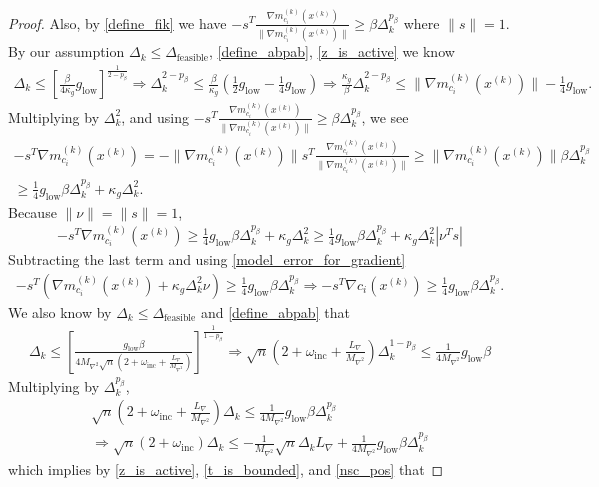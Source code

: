 \documentclass{article}
\theoremstyle{case}
\numberwithin{theorem}{subsection}
\newcommand{\dfeas}{{\Delta_{\textrm{feasible}}}}
\newcommand{\dk}{\Delta_k}
\newcommand{\gmcik}{{\nabla m_{c_i}^{(k)}\left(\xk\right)}}
\newcommand{\hgik}{{\frac{\nabla m^{(k)}_{c_i}(\xk)}{\|\nabla m^{(k)}_{c_i}\left(\xk\right)\|}}}
\newcommand{\lipgrad}{{L_{\nabla}}}
\newcommand{\maxhessian}{{M_{\nabla^2}}}
\newcommand{\mingrad}{{ g_{\textrm{low}} }}
\newcommand{\omegainc}{\omega_{\text{inc}}}
\newcommand{\xk}{x^{(k)}}
\begin{document}
\begin{proof}
Also, by \cref{define_fik} we have $-s^T \hgik \ge \beta \dk^{p_{\beta}}$ where $\|s\| = 1$.
By our assumption $\dk \le \dfeas$, \cref{define_abpab}, \cref{z_is_active} we know
\begin{align*}
\dk \le \left[\frac{\beta}{4\kappa_g}\mingrad \right]^{\frac 1 {2 - p_{\beta}}}
\Longrightarrow \dk^{2 - p_{\beta}} \le \frac{\beta}{\kappa_g}\left(\frac 1 2\mingrad  - \frac 1 4 \mingrad \right)
\Longrightarrow \frac{\kappa_g}{\beta} \dk^{2 - p_{\beta}} \le \|\gmcik\| - \frac 1 4 \mingrad.
\end{align*}
Multiplying by $\dk^2$, and using $-s^T \hgik \ge \beta \dk^{p_{\beta}}$, we see
\begin{align*}
-s^T\gmcik =  -\|\gmcik\|s^T\hgik \ge \|\gmcik\|\beta\dk^{p_{\beta}} \\
\ge \frac 1 4 \mingrad  \beta \dk^{p_{\beta}} + \kappa_g\dk^2.
\end{align*}
Because $\|\nu\| = \|s\| = 1$,
\begin{align*}
-s^T\gmcik \ge \frac 1 4 \mingrad  \beta \dk^{p_{\beta}} + \kappa_g\dk^2 \ge \frac 1 4 \mingrad  \beta \dk^{p_{\beta}} + \kappa_g\dk^2|\nu^T s|
\end{align*}
Subtracting the last term and using \cref{model_error_for_gradient}
\begin{align}
-s^T\left(\gmcik + \kappa_g\dk^2\nu\right) \ge \frac 1 4 \mingrad  \beta \dk ^{p_{\beta}}
\Longrightarrow -s^T\nabla c_i(\xk) \ge \frac 1 4 \mingrad  \beta \dk^{p_{\beta}}. \label{nsc_pos}
\end{align}
We also know by $\dk \le \dfeas$ and \cref{define_abpab} that
\begin{align*}
\dk \le \left[\frac {\mingrad  \beta} {4\maxhessian\sqrt{n}\left(2 + \omegainc + \frac {\lipgrad} \maxhessian \right)}\right]^{\frac1 {1 - p_{\beta}} }
\Longrightarrow \sqrt{n}\left(2 + \omegainc + \frac {\lipgrad} \maxhessian \right) \dk^{1-p_{\beta}}\le \frac 1 {4\maxhessian} \mingrad  \beta
\end{align*}
Multiplying by $\dk^{p_{\beta}}$,
\begin{align*}
\sqrt{n}\left(2 + \omegainc + \frac {\lipgrad} \maxhessian \right) \dk \le \frac 1 {4\maxhessian} \mingrad  \beta \dk^{p_{\beta}} \\
\Longrightarrow \sqrt{n}\left(2 + \omegainc \right) \dk \le -\frac 1 \maxhessian \sqrt{n}\dk \lipgrad + \frac 1 {4\maxhessian} \mingrad  \beta \dk^{p_{\beta}}
\end{align*}
which implies by \cref{z_is_active}, \cref{t_is_bounded}, and \cref{nsc_pos} that

\end{proof}
\end{document}
